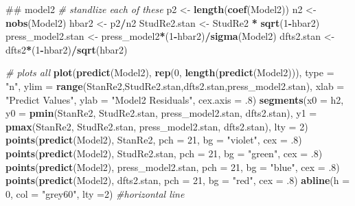 \documentclass[]{article}
\newenvironment{Shaded}{\begin{snugshade}}{\end{snugshade}}
\newcommand{\KeywordTok}[1]{\textcolor[rgb]{0.13,0.29,0.53}{\textbf{#1}}}
\newcommand{\DataTypeTok}[1]{\textcolor[rgb]{0.13,0.29,0.53}{#1}}
\newcommand{\DecValTok}[1]{\textcolor[rgb]{0.00,0.00,0.81}{#1}}
\newcommand{\StringTok}[1]{\textcolor[rgb]{0.31,0.60,0.02}{#1}}
\newcommand{\CommentTok}[1]{\textcolor[rgb]{0.56,0.35,0.01}{\textit{#1}}}
\newcommand{\OperatorTok}[1]{\textcolor[rgb]{0.81,0.36,0.00}{\textbf{#1}}}
\newcommand{\NormalTok}[1]{#1}
\begin{document}
\begin{Shaded}
\begin{Highlighting}[]
\NormalTok{## model2}
\CommentTok{# standlize each of these}
\NormalTok{p2 <-}\StringTok{ }\KeywordTok{length}\NormalTok{(}\KeywordTok{coef}\NormalTok{(Model2))}
\NormalTok{n2 <-}\StringTok{ }\KeywordTok{nobs}\NormalTok{(Model2)}
\NormalTok{hbar2 <-}\StringTok{ }\NormalTok{p2}\OperatorTok{/}\NormalTok{n2}
\NormalTok{StudRe2.stan <-}\StringTok{ }\NormalTok{StudRe2 }\OperatorTok{*}\StringTok{ }\KeywordTok{sqrt}\NormalTok{(}\DecValTok{1}\OperatorTok{-}\NormalTok{hbar2)}
\NormalTok{press_model2.stan <-}\StringTok{ }\NormalTok{press_model2}\OperatorTok{*}\NormalTok{(}\DecValTok{1}\OperatorTok{-}\NormalTok{hbar2)}\OperatorTok{/}\KeywordTok{sigma}\NormalTok{(Model2)}
\NormalTok{dfts2.stan <-}\StringTok{ }\NormalTok{dfts2}\OperatorTok{*}\NormalTok{(}\DecValTok{1}\OperatorTok{-}\NormalTok{hbar2)}\OperatorTok{/}\KeywordTok{sqrt}\NormalTok{(hbar2)}

\CommentTok{# plots all }
\KeywordTok{plot}\NormalTok{(}\KeywordTok{predict}\NormalTok{(Model2), }\KeywordTok{rep}\NormalTok{(}\DecValTok{0}\NormalTok{, }\KeywordTok{length}\NormalTok{(}\KeywordTok{predict}\NormalTok{(Model2))),}
     \DataTypeTok{type =} \StringTok{"n"}\NormalTok{,}
     \DataTypeTok{ylim =} \KeywordTok{range}\NormalTok{(StanRe2,StudRe2.stan,dfts2.stan,press_model2.stan),}
     \DataTypeTok{xlab =} \StringTok{"Predict Values"}\NormalTok{, }
     \DataTypeTok{ylab =} \StringTok{"Model2 Residuals"}\NormalTok{, }
     \DataTypeTok{cex.axis =}\NormalTok{ .}\DecValTok{8}\NormalTok{)}
\KeywordTok{segments}\NormalTok{(}\DataTypeTok{x0 =}\NormalTok{ h2,}
        \DataTypeTok{y0 =} \KeywordTok{pmin}\NormalTok{(StanRe2, StudRe2.stan, press_model2.stan, dfts2.stan),}
        \DataTypeTok{y1 =} \KeywordTok{pmax}\NormalTok{(StanRe2, StudRe2.stan, press_model2.stan, dfts2.stan),}
        \DataTypeTok{lty =} \DecValTok{2}\NormalTok{)}
\KeywordTok{points}\NormalTok{(}\KeywordTok{predict}\NormalTok{(Model2), StanRe2, }\DataTypeTok{pch =} \DecValTok{21}\NormalTok{, }\DataTypeTok{bg =} \StringTok{"violet"}\NormalTok{, }\DataTypeTok{cex =}\NormalTok{ .}\DecValTok{8}\NormalTok{)}
\KeywordTok{points}\NormalTok{(}\KeywordTok{predict}\NormalTok{(Model2), StudRe2.stan, }\DataTypeTok{pch =} \DecValTok{21}\NormalTok{, }\DataTypeTok{bg =} \StringTok{"green"}\NormalTok{, }\DataTypeTok{cex =}\NormalTok{ .}\DecValTok{8}\NormalTok{)}
\KeywordTok{points}\NormalTok{(}\KeywordTok{predict}\NormalTok{(Model2), press_model2.stan, }\DataTypeTok{pch =} \DecValTok{21}\NormalTok{, }\DataTypeTok{bg =} \StringTok{"blue"}\NormalTok{, }\DataTypeTok{cex =}\NormalTok{ .}\DecValTok{8}\NormalTok{)}
\KeywordTok{points}\NormalTok{(}\KeywordTok{predict}\NormalTok{(Model2), dfts2.stan, }\DataTypeTok{pch =} \DecValTok{21}\NormalTok{, }\DataTypeTok{bg =} \StringTok{"red"}\NormalTok{, }\DataTypeTok{cex =}\NormalTok{ .}\DecValTok{8}\NormalTok{)}
\KeywordTok{abline}\NormalTok{(}\DataTypeTok{h =} \DecValTok{0}\NormalTok{, }\DataTypeTok{col =} \StringTok{"grey60"}\NormalTok{, }\DataTypeTok{lty =}\DecValTok{2}\NormalTok{) }\CommentTok{#horizontal line}
\end{Highlighting}
\end{Shaded}
\end{document}
